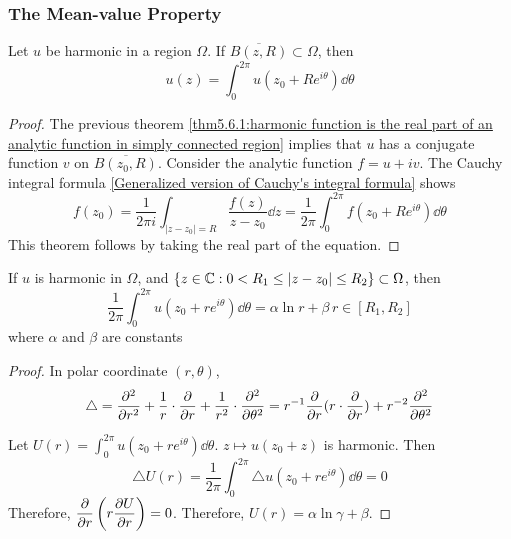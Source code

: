 \subsubsection{The Mean-value Property}

\begin{theorem}\label{thm:5.6.2:mean-value property}
    Let  $ u  $ be harmonic in a region  $ \Omega  $. If  $ \overline{B(z,R)}\subset \Omega $, then 
    \begin{equation}
        u(z)=\int_0^{2\pi }u(z_0+Re^{i\theta})\dd \theta\label{eq:5.6.2:mean-value property}
    \end{equation} 
\end{theorem}
\begin{proof}
    The previous theorem \ref{thm5.6.1:harmonic function is the real part of an analytic function in simply connected region} implies that  $ u  $ has a conjugate function  $ v  $ on  $ \overline{B(z_0,R)} $. Consider the analytic function  $ f=u+iv $. The Cauchy integral formula \ref{Generalized version of Cauchy's integral formula}  shows 
    \begin{equation}
        f(z_0)=\frac{1}{2\pi i}\int_{|z-z_0|=R}\frac{f(z)}{z-z_0}\dd z=\frac{1 }{2\pi }\int_0^{2\pi }f(z_0+Re^{i\theta})\dd \theta
    \end{equation}
    This theorem follows by taking the real part of the equation.
\end{proof}
\begin{theorem}\label{thm:5.6.2:equation of mean value  property for more general harmonic function in a cirque}
    If  $ u  $ is harmonic in  $ \Omega $, and  $ \{z\in\mathbb C:0<R_1 \leq |z-z_0| \leq R_2\}\subset \Omega $, then 
    \begin{equation}
        \frac{1 }{2\pi }\int_0^{2\pi }u(z_0+re^{i\theta})\dd\theta=\alpha\ln r+\beta\,r\in [R_1,R_2]
    \end{equation}  
    where  $ \alpha $ and  $ \beta $ are constants  
\end{theorem}
\begin{proof}
    In polar coordinate  $ (r,\theta) $,  \[ \displaystyle\triangle=\frac{\partial^2 }{\partial r^2}+\frac{1}{r}\cdot\frac{\partial }{\partial r} +\frac{1}{r^2}\cdot\frac{\partial^2 }{\partial \theta^2}=r^{-1}\frac{\partial }{\partial r}(r\cdot\frac{\partial }{\partial r})+r^{-2}\frac{\partial ^2}{\partial \theta^2}\]

    Let  $ U(r)=\int_0^{2\pi }u(z_0+re^{i\theta})\dd\theta $.  $ z\mapsto u(z_0+z) $ is harmonic. Then 
    \begin{equation}
        \triangle U(r)=\frac{1}{2\pi }\int_0^{2\pi }\triangle u(z_0+re^{i\theta})\dd \theta=0
    \end{equation} 
    Therefore,  $ \displaystyle\frac{\partial }{\partial r}\left(r\frac{\partial U}{\partial r}\right)=0 $. Therefore,
     $ U(r)=\alpha\ln \gamma+\beta $.  
\end{proof}
